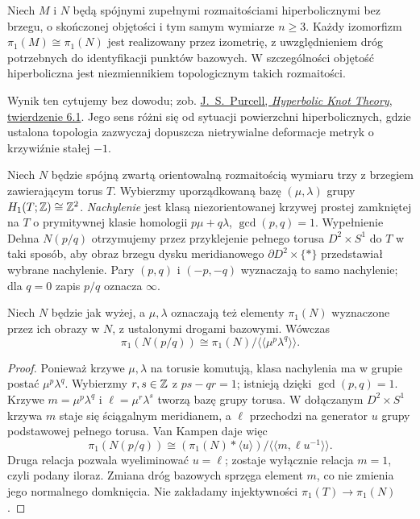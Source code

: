 \begin{twierdzenie}
\label{thm:thur-dop-mostow-prasad}
Niech $M$ i $N$ będą spójnymi zupełnymi rozmaitościami
hiperbolicznymi bez brzegu, o skończonej objętości i tym samym
wymiarze $n\ge3$. Każdy izomorfizm
$\pi_1(M)\cong\pi_1(N)$ jest realizowany przez izometrię,
z uwzględnieniem dróg potrzebnych do identyfikacji punktów bazowych.
W szczególności objętość hiperboliczna jest
niezmiennikiem topologicznym takich rozmaitości.
\end{twierdzenie}
Wynik ten cytujemy bez dowodu; zob.
\href{https://users.monash.edu/~jpurcell/book/HypKnotTheory.pdf}
{J.\ S.\ Purcell, \emph{Hyperbolic Knot Theory}, twierdzenie 6.1}.
Jego sens różni się od
sytuacji powierzchni hiperbolicznych, gdzie ustalona
topologia zazwyczaj dopuszcza nietrywialne deformacje
metryk o krzywiźnie stałej $-1$.

\begin{definicja}
\label{def:thur-dop-dehn-fill}
Niech $N$ będzie spójną zwartą orientowalną rozmaitością wymiaru trzy
z brzegiem zawierającym torus $T$. Wybierzmy
uporządkowaną bazę $(\mu,\lambda)$ grupy
$H_1(T;\mathbb{Z})\cong\mathbb{Z}^2$. \emph{Nachylenie} jest klasą
niezorientowanej krzywej prostej zamkniętej na $T$ o prymitywnej
klasie homologii $p\mu+q\lambda$, $\gcd(p,q)=1$.
Wypełnienie Dehna $N(p/q)$ otrzymujemy przez
przyklejenie pełnego torusa $D^2\times S^1$ do $T$
w taki sposób, aby obraz brzegu dysku meridianowego
$\partial D^2\times\{*\}$ przedstawiał wybrane nachylenie.
Pary $(p,q)$ i $(-p,-q)$ wyznaczają to samo nachylenie;
dla $q=0$ zapis $p/q$ oznacza $\infty$.
\end{definicja}

\begin{stwierdzenie}
\label{prop:thur-dop-dehn-pi1}
Niech $N$ będzie jak wyżej,
a $\mu,\lambda$ oznaczają też elementy $\pi_1(N)$
wyznaczone przez ich obrazy w $N$, z ustalonymi
drogami bazowymi. Wówczas
\[
 \pi_1(N(p/q))\cong
 \pi_1(N)/\langle\!\langle\mu^p\lambda^q\rangle\!\rangle.
\]
\end{stwierdzenie}
\begin{proof}
Ponieważ krzywe $\mu,\lambda$ na torusie komutują,
klasa nachylenia ma w grupie postać $\mu^p\lambda^q$.
Wybierzmy $r,s\in\mathbb{Z}$ z $ps-qr=1$; istnieją dzięki
$\gcd(p,q)=1$. Krzywe $m=\mu^p\lambda^q$ i
$\ell=\mu^r\lambda^s$ tworzą bazę grupy torusa.
W dołączanym $D^2\times S^1$ krzywa $m$ staje się
ściągalnym meridianem, a $\ell$ przechodzi na generator $u$
grupy podstawowej pełnego torusa. Van Kampen daje więc
\[
 \pi_1(N(p/q))\cong
 (\pi_1(N)*\langle u\rangle)/
 \langle\!\langle m,\ell u^{-1}\rangle\!\rangle.
\]
Druga relacja pozwala wyeliminować $u=\ell$; zostaje
wyłącznie relacja $m=1$, czyli podany iloraz.
Zmiana dróg bazowych sprzęga element $m$, co nie zmienia
jego normalnego domknięcia. Nie zakładamy injektywności
$\pi_1(T)\to\pi_1(N)$.
\end{proof}

